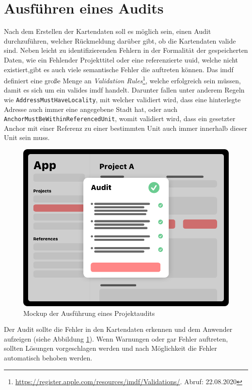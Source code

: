 \section{Ausführen eines Audits}
\label{sec:validation}
Nach dem Erstellen der Kartendaten soll es möglich sein, einen Audit durchzuführen, welcher Rückmeldung darüber gibt, ob die Kartendaten valide sind.
Neben leicht zu identifizierenden Fehlern in der Formalität der gespeicherten Daten, wie ein Fehlender Projekttitel oder eine referenzierte \ac{uuid}, welche nicht existiert,gibt es auch viele semantische Fehler die auftreten können.
Das \acl{imdf} definiert eine große Menge an \emph{Validation Rules}\footnote{\url{https://register.apple.com/resources/imdf/Validations/}. Abruf: 22.08.2020}, welche erfolgreich sein müssen, damit es sich um ein valides \ac{imdf} handelt.
Darunter fallen unter anderem Regeln wie \texttt{AddressMustHaveLocality}, mit welcher validiert wird, dass eine hinterlegte Adresse auch immer eine angegebene Stadt hat, oder auch \texttt{AnchorMustBeWithinReferencedUnit}, womit validiert wird, dass ein gesetzter Anchor mit einer Referenz zu einer bestimmten Unit auch immer innerhalb dieser Unit sein muss.
\begin{figure}[h!]
	\centering
	\vspace{15pt}
	\includegraphics[scale=0.4]{images/design-project-audit}
	\caption{Mockup der Ausführung eines Projektaudits}
	\label{fig:design-project-audit}
\end{figure}
Der Audit sollte die Fehler in den Kartendaten erkennen und dem Anwender aufzeigen (siehe Abbildung \ref{fig:design-project-audit}).
Wenn Warnungen oder gar Fehler auftreten, sollten Lösungen vorgeschlagen werden und nach Möglichkeit die Fehler automatisch behoben werden.


